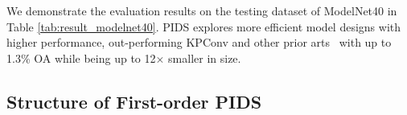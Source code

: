 \documentclass[10pt,twocolumn,letterpaper]{article}
\begin{document}
We demonstrate the evaluation results on the testing dataset of ModelNet40 in Table \ref{tab:result_modelnet40}.
PIDS explores more efficient model designs with higher performance, out-performing KPConv and other prior arts~\cite{goyal2021revisiting} with up to 1.3\% OA while being up to 12$\times$ smaller in size.


\subsection{Structure of First-order PIDS}
\begin{table}[h]
\caption{Structure of hand-crafted PIDS (first-order). "1/2" strides means up-sampling by 2$\times$, and "O" denotes "Octahedron" kernel with 7 kernel points. All point operators employ a first-order point interaction.}
\begin{center}
\end{center}
\label{tab:pids_1st_order}
\vspace{-2em}
\end{table}
\end{document}
